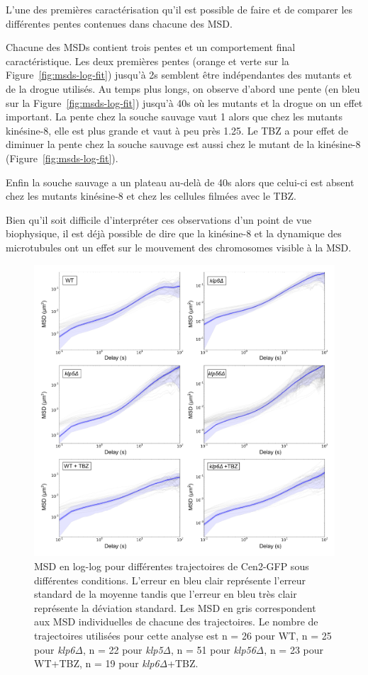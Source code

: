 \documentclass[12pt,a4paper,twoside,openright]{book}
\begin{document}
L'une des premières caractérisation qu'il est possible de faire et de
comparer les différentes pentes contenues dans chacune des MSD.

Chacune des MSDs contient trois pentes et un comportement final
caractéristique. Les deux premières pentes (orange et verte sur la
Figure~\ref{fig:msds-log-fit}) jusqu'à 2s semblent être indépendantes
des mutants et de la drogue utilisés. Au temps plus longs, on observe
d'abord une pente (en bleu sur la Figure~\ref{fig:msds-log-fit}) jusqu'à
40s où les mutants et la drogue on un effet important. La pente chez la
souche sauvage vaut 1 alors que chez les mutants kinésine-8, elle est
plus grande et vaut à peu près 1.25. Le TBZ a pour effet de diminuer la
pente chez la souche sauvage est aussi chez le mutant de la kinésine-8
(Figure~\ref{fig:msds-log-fit}).

Enfin la souche sauvage a un plateau au-delà de 40s alors que celui-ci
est absent chez les mutants kinésine-8 et chez les cellules filmées avec
le TBZ.

Bien qu'il soit difficile d'interpréter ces observations d'un point de
vue biophysique, il est déjà possible de dire que la kinésine-8 et la
dynamique des microtubules ont un effet sur le mouvement des chromosomes
visible à la MSD.

\begin{figure}[htbp]
\centering
\includegraphics{figures/results/imaging/msds_log.png}
\caption[MSD en log-log pour différentes trajectoires de Cen2-GFP sous différentes conditions]{\label{fig:msds-log}MSD
en log-log pour différentes trajectoires de Cen2-GFP sous différentes
conditions. L'erreur en bleu clair représente l'erreur standard de la
moyenne tandis que l'erreur en bleu très clair représente la déviation
standard. Les MSD en gris correspondent aux MSD individuelles de chacune
des trajectoires. Le nombre de trajectoires utilisées pour cette analyse
est n = 26 pour WT, n = 25 pour \emph{klp6Δ}, n = 22 pour \emph{klp5Δ},
n = 51 pour \emph{klp56Δ}, n = 23 pour WT+TBZ, n = 19 pour
\emph{klp6Δ}+TBZ.}
\end{figure}
\end{document}
